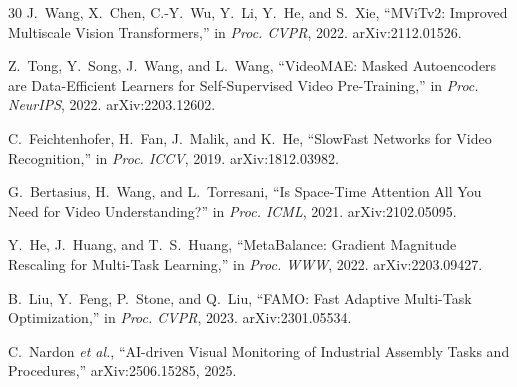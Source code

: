 \documentclass[conference]{IEEEtran}
\begin{document}
\begin{thebibliography}{30}
J.~Wang, X.~Chen, C.-Y.~Wu, Y.~Li, Y.~He, and S.~Xie,
``MViTv2: Improved Multiscale Vision Transformers,''
in \emph{Proc. CVPR}, 2022.
arXiv:2112.01526.

Z.~Tong, Y.~Song, J.~Wang, and L.~Wang,
``VideoMAE: Masked Autoencoders are Data-Efficient Learners for Self-Supervised Video Pre-Training,''
in \emph{Proc. NeurIPS}, 2022.
arXiv:2203.12602.

C.~Feichtenhofer, H.~Fan, J.~Malik, and K.~He,
``SlowFast Networks for Video Recognition,''
in \emph{Proc. ICCV}, 2019.
arXiv:1812.03982.

G.~Bertasius, H.~Wang, and L.~Torresani,
``Is Space-Time Attention All You Need for Video Understanding?''
in \emph{Proc. ICML}, 2021.
arXiv:2102.05095.

Y.~He, J.~Huang, and T.~S.~Huang,
``MetaBalance: Gradient Magnitude Rescaling for Multi-Task Learning,''
in \emph{Proc. WWW}, 2022.
arXiv:2203.09427.

B.~Liu, Y.~Feng, P.~Stone, and Q.~Liu,
``FAMO: Fast Adaptive Multi-Task Optimization,''
in \emph{Proc. CVPR}, 2023.
arXiv:2301.05534.

C.~Nardon \emph{et al.},
``AI-driven Visual Monitoring of Industrial Assembly Tasks and Procedures,''
arXiv:2506.15285, 2025.

\end{thebibliography}
\end{document}

